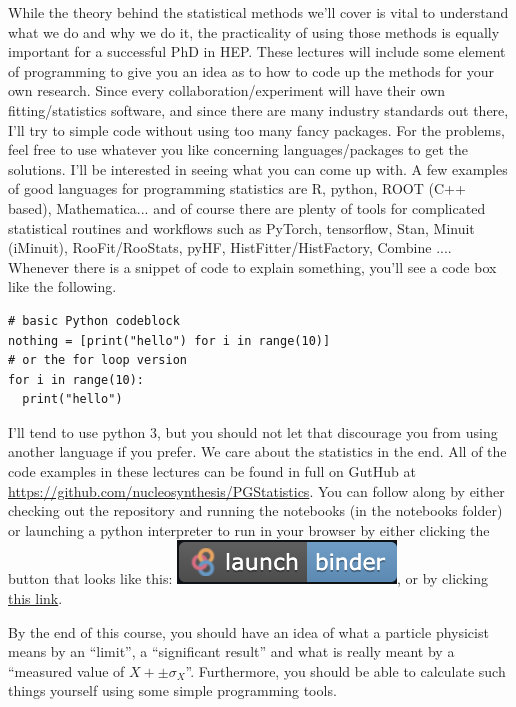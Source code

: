 While the theory behind the statistical methods we'll cover is vital to understand what we do and why we do it, the practicality of using those methods is equally important for a successful PhD in HEP. These lectures will include some element of programming to give you an idea as to how to code up the methods for your own research. Since every collaboration/experiment will have their own fitting/statistics software, and since there are many industry standards out there, I'll try to simple code without using too many fancy packages. For the problems, feel free to use whatever you like concerning languages/packages to get the solutions. I'll be interested in seeing what you can come up with. A few examples of good languages for programming statistics are \textsf{R, python, ROOT (C++ based), Mathematica...} and of course there are plenty of tools for complicated statistical routines and workflows such as \textsf{PyTorch, tensorflow, Stan, Minuit (iMinuit), RooFit/RooStats, pyHF, HistFitter/HistFactory, Combine ...}. 
Whenever there is a snippet of code to explain something, you'll see a code box like the following. 

\begin{lstlisting}[style = Python]
# basic Python codeblock
nothing = [print("hello") for i in range(10)]
# or the for loop version
for i in range(10): 
  print("hello")
\end{lstlisting}

I'll tend to use \textsf{python 3}, but you should not let that discourage you from using another language if you prefer. We care about the statistics in the end. All of the code examples in these lectures can be found in full on \textsf{GutHub} at  \url{https://github.com/nucleosynthesis/PGStatistics}. You can follow along by either checking out the repository and running the notebooks (in the  \textsf{notebooks} folder) or launching a python interpreter to run in your browser by either clicking the button that looks like this: \includegraphics[height=1.2\fontcharht\font`\B]{figures/binder.png}, or by clicking \href{https://mybinder.org/v2/gh/nucleosynthesis/PGStatistics/main?urlpath=lab}{this link}. 

By the end of this course, you should have an idea of what a particle physicist means by an ``limit'', a ``significant result'' and what is really meant by a ``measured value of  $X+\pm \sigma_{X}$''. Furthermore, you should be able to calculate such things yourself using some simple programming tools.  

